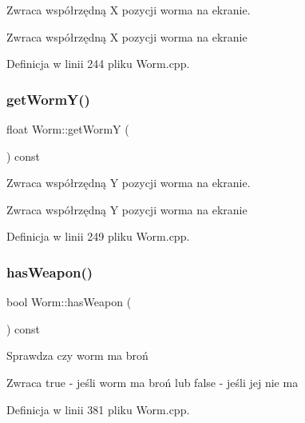 Zwraca współrzędną X pozycji worma na ekranie. 

\begin{DoxyReturn}{Zwraca}
współrzędną X pozycji worma na ekranie 
\end{DoxyReturn}


Definicja w linii 244 pliku Worm.\+cpp.

\mbox{\label{class_worm_aa1a5e5334f8d3e339f15b36a9af31f27}} 
\subsubsection{\texorpdfstring{get\+Worm\+Y()}{getWormY()}}
{\footnotesize\ttfamily float Worm\+::get\+WormY (\begin{DoxyParamCaption}{ }\end{DoxyParamCaption}) const}



Zwraca współrzędną Y pozycji worma na ekranie. 

\begin{DoxyReturn}{Zwraca}
współrzędną Y pozycji worma na ekranie 
\end{DoxyReturn}


Definicja w linii 249 pliku Worm.\+cpp.

\mbox{\label{class_worm_a15fc66d733ecfe886495910f591d1a34}} 
\subsubsection{\texorpdfstring{has\+Weapon()}{hasWeapon()}}
{\footnotesize\ttfamily bool Worm\+::has\+Weapon (\begin{DoxyParamCaption}{ }\end{DoxyParamCaption}) const}



Sprawdza czy worm ma broń 

\begin{DoxyReturn}{Zwraca}
true -\/ jeśli worm ma broń lub false -\/ jeśli jej nie ma 
\end{DoxyReturn}


Definicja w linii 381 pliku Worm.\+cpp.

\mbox{\label{class_worm_a606868b7856598eef50b8ebcd2374927}} 
